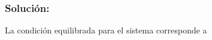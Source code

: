 \documentclass[a4paper,12pt,twoside]{proyectotanquesecci}
\begin{document}

\subsubsection{Solución:}

La condición equilibrada para el sistema corresponde a 

\begin{equation}
\end{equation}


\begin{equation}
\end{equation}



\end{document}
